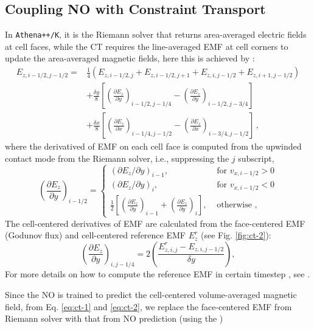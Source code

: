 \documentclass[%
 reprint,
 superscriptaddress,
 amsmath,amssymb,
 nofootinbib,
 prd,
]{revtex4-2}
\newcommand{\hywcom}[1]{{\color{purple}{[HYW: #1]}}}
\begin{document}
\subsection{Coupling NO with Constraint Transport}
In \texttt{Athena++/K}, it is the Riemann solver that returns area-averaged electric fields at cell faces, while the CT requires the line-averaged EMF at cell corners to update the area-averaged magnetic fields, here this is achieved by \cite{Gardiner:2005JCoPh.205..509G,Gardiner2008,Stone:2008mh}:
\begin{align}
E_{z, i-1 / 2, j-1 / 2}= 
&\frac{1}{4}\left(E_{z, i-1 / 2, j}+E_{z, i-1 / 2, j+1}+E_{z, i, j-1 / 2}+E_{z, i+1, j-1 / 2}\right) \\
&+\frac{\delta y}{8}\left[\left(\frac{\partial E_z}{\partial y}\right)_{i-1 / 2, j-1 / 4}-\left(\frac{\partial E_z}{\partial y}\right)_{i-1 / 2, j-3 / 4}\right] \\
&+\frac{\delta x}{8}\left[\left(\frac{\partial E_z}{\partial x}\right)_{i-1 / 4, j-1 / 2}-\left(\frac{\partial E_z}{\partial x}\right)_{i-3 / 4, j-1 / 2}\right] \,,  \label{eq:ct-1}
\end{align}
where the derivatived of EMF on each cell face is computed from the upwinded contact mode from the Riemann solver, i.e., suppressing the $j$ subscript,
\begin{equation}
\left(\frac{\partial E_z}{\partial y}\right)_{i-1 / 2}= 
\begin{cases}
\left(\partial E_z / \partial y\right)_{i-1}, & \text { for } v_{x, i-1 / 2}>0 \\ 
\left(\partial E_z / \partial y\right)_i, & \text { for } v_{x, i-1 / 2}<0 \\ 
\frac{1}{2}\left[\left(\frac{\partial E_z}{\partial y}\right)_{i-1}+\left(\frac{\partial E_z}{\partial y}\right)_i\right], & \text { otherwise },
\end{cases}
\end{equation}
The cell-centered derivatives of EMF are calculated from the face-centered EMF (Godunov flux) and cell-centered reference EMF $E^r_z$ (see Fig. \ref{fig:ct-2}):
\begin{equation}
\left(\frac{\partial E_z}{\partial y}\right)_{i, j-1 / 4}=2\left(\frac{E_{z, i, j}^r-E_{z, i, j-1 / 2}}{\delta y}\right), \label{eq:ct-2}
\end{equation}
For more details on how to compute the reference EMF in certain timestep \hywcom{refine the description here}, see \cite{Stone:2008mh}. 

Since the NO is trained to predict the cell-centered volume-averaged magnetic field, from Eq. \ref{eq:ct-1} and \ref{eq:ct-2}, we replace the face-centered EMF from Riemann solver with that from NO prediction (using the )
\end{document}
